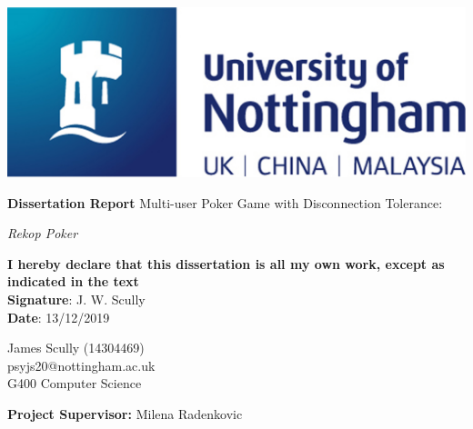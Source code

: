 \documentclass[11pt]{article}
\begin{document}
\begin{center}
	\includegraphics[scale=0.4]{uni_logo}
	
	\vspace{1cm}
	
	{\Large \textbf{Dissertation Report} 
		\linebreak
		Multi-user Poker Game with Disconnection Tolerance: 		
		\linebreak

		\textit{Rekop Poker}} 		
		\linebreak
		

	\textbf{I hereby declare that this dissertation is all my own work, except as indicated in the text}\\
	\textbf{Signature}: J. W. Scully \\
	\textbf{Date}: 13/12/2019 \linebreak
		
	\begin{large}
		James Scully (14304469) \\
		psyjs20@nottingham.ac.uk \\
		G400 Computer Science \linebreak \\ 
	\end{large}
	
\end{center}

\vfill

\begin{center}
	\textbf{Project Supervisor:} Milena Radenkovic
\end{center}

\hspace{0pt}

\pagebreak


\newcommand{\entry}[1]{
	\textbf{#1} - 
}

\newcommand{\TODO}[1]{
	\textbf{{\Large \emph{#1}}}
}



\tableofcontents
\end{document}
